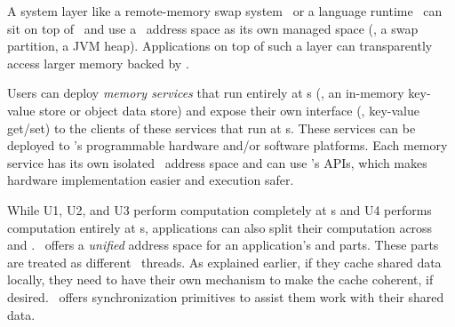 
A system layer like a remote-memory swap system~\cite{InfiniSwap,FastSwap} or a language runtime~\cite{Semeru}
can sit on top of \sys\ and use a \sys\ address space as its own managed space (\eg, a swap partition, a JVM heap).
Applications on top of such a layer can transparently access larger memory backed by \sys.


Users can deploy {\em memory services} that run entirely at \MN{}s (\eg, 
an in-memory key-value store or object data store) 
and expose their own interface (\eg, key-value get/set) 
to the clients of these services that run at \CN{}s.
These services can be deployed to \sysboard's programmable hardware and/or software platforms.
Each memory service has its own isolated \sys\ address space and can use \sys's APIs, 
which makes hardware implementation easier and execution safer.

While U1, U2, and U3 perform computation completely at \CN{}s and U4 performs computation entirely at \MN{}s,
applications can also split their computation across \CN{} and \MN{}.
\sys\ offers a {\em unified} address space for an application's \CN{} and \MN{} parts.
These parts are treated as different \sys\ threads. 
As explained earlier, if they cache shared data locally, they need to have their own mechanism to make the cache coherent, if desired.
\sys\ offers synchronization primitives to assist them work with their shared data.

\fi
